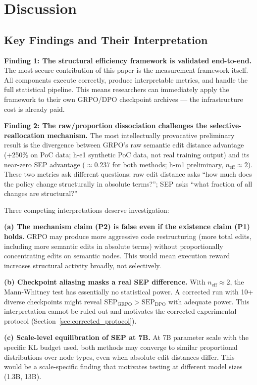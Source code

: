 \section{Discussion}
\label{sec:discussion}

\subsection{Key Findings and Their Interpretation}

\textbf{Finding 1: The structural efficiency framework is validated end-to-end.}
The most secure contribution of this paper is the measurement framework itself.
All components execute correctly, produce interpretable metrics, and handle the
full statistical pipeline. This means researchers can immediately apply the
framework to their own GRPO/DPO checkpoint archives --- the infrastructure cost
is already paid.

\textbf{Finding 2: The raw/proportion dissociation challenges the selective-reallocation mechanism.}
The most intellectually provocative preliminary result is the divergence between
GRPO's raw semantic edit distance advantage (+250\% on PoC data; h-e1 synthetic
PoC data, not real training output) and its near-zero SEP advantage ($\approx$0.237 for
both methods; h-m1 preliminary, $n_\text{eff}\approx2$). These two metrics ask different
questions: raw edit distance asks ``how much does the policy change structurally
in absolute terms?''; SEP asks ``what fraction of all changes are structural?''

Three competing interpretations deserve investigation:

\textbf{(a) The mechanism claim (P2) is false even if the existence claim (P1) holds.}
GRPO may produce more aggressive code restructuring (more total edits, including
more semantic edits in absolute terms) without proportionally concentrating edits
on semantic nodes. This would mean execution reward increases structural activity
broadly, not selectively.

\textbf{(b) Checkpoint aliasing masks a real SEP difference.}
With $n_\text{eff} \approx 2$, the Mann-Whitney test has essentially no statistical
power. A corrected run with 10+ diverse checkpoints might reveal $\text{SEP}_\text{GRPO} > \text{SEP}_\text{DPO}$
with adequate power. This interpretation cannot be ruled out
and motivates the corrected experimental protocol (Section~\ref{sec:corrected_protocol}).

\textbf{(c) Scale-level equilibration of SEP at 7B.}
At 7B parameter scale with the specific KL budget used, both methods may converge
to similar proportional distributions over node types, even when absolute edit
distances differ. This would be a scale-specific finding that motivates testing
at different model sizes (1.3B, 13B).

